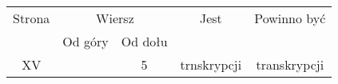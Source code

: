 \documentclass[a4paper,11pt]{article}
\numberwithin{equation}{section}
\begin{document}
\begin{center}

  \begin{tabular}{|c|c|c|c|c|}
    \hline
    Strona & \multicolumn{2}{c|}{Wiersz} & Jest
                              & Powinno być \\ \cline{2-3}
    & Od góry & Od dołu & & \\
    \hline
    XV  & &  5 & trnskrypcji & transkrypcji \\
    \hline
  \end{tabular}






\end{center}
\end{document}
